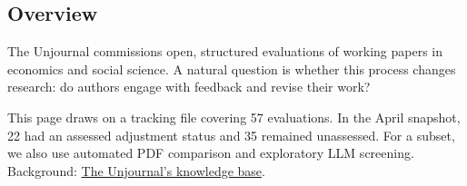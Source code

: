 \documentclass[
  11pt,
  letterpaper,
]{article}
\begin{document}
\subsection{Overview}\label{overview}

The Unjournal commissions open, structured evaluations of working papers
in economics and social science. A natural question is whether this
process changes research: do authors engage with feedback and revise
their work?

This page draws on a tracking file covering 57 evaluations. In the April
snapshot, 22 had an assessed adjustment status and 35 remained
unassessed. For a subset, we also use automated PDF comparison and
exploratory LLM screening. Background:
\href{https://globalimpact.gitbook.io/the-unjournal-project-and-communication-space/benefits-and-features/more-reliable-and-useful-evaluation/author-engagement-evidence}{The
Unjournal's knowledge base}.
\end{document}

